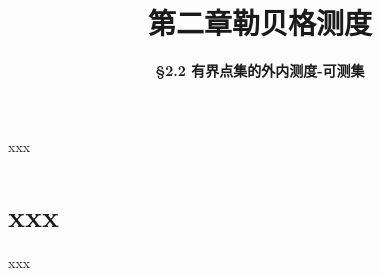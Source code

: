 


\title[第二章\\
勒贝格测度]{\texorpdfstring{\LARGE \bfseries 第二章\quad 勒贝格测度}{第二章 勒贝格测度}} %
\author[\S 2.2\\
外内测度-可测集] %
{\Large \bfseries \S 2.2 有界点集的外内测度-可测集}
\date{}





\begin{frame}

\titlepage %

\end{frame}





\begin{frame}{xxx}



\end{frame}


\section{xxx}


\begin{frame}{xxx}


\end{frame}



